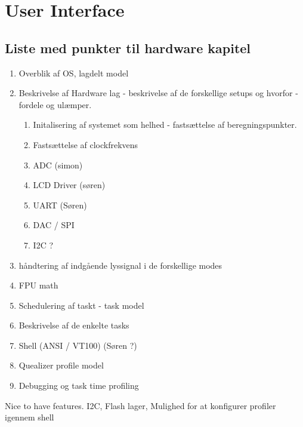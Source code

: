 \chapter{User Interface}\label{kap:hardware}

\section{Liste med punkter til hardware kapitel}

\begin{enumerate}
	\item Overblik af OS, lagdelt model
	\item Beskrivelse af Hardware lag - beskrivelse af de forskellige setups og hvorfor - fordele og ulæmper.
	\begin{enumerate}
		\item Initalisering af systemet som helhed - fastsættelse af beregningspunkter.
		\item Fastsættelse af clockfrekvens
		\item ADC (simon)
		\item LCD Driver (søren)
		\item UART (Søren)
		\item DAC / SPI
		\item I2C ?
	\end{enumerate}
	\item håndtering af indgående lyssignal i de forskellige modes
	\item FPU math
	\item Schedulering af taskt - task model 
	\item Beskrivelse af de enkelte tasks
	\item Shell (ANSI / VT100) (Søren ?) 
	\item Quealizer profile model
	\item Debugging og task time profiling
	
\end{enumerate}

Nice to have features.
I2C, Flash lager, Mulighed for at konfigurer profiler igennem shell 